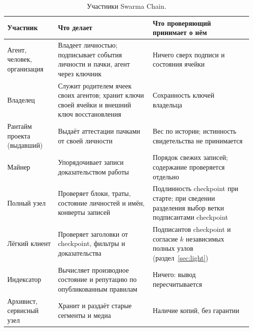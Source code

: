 \documentclass[10pt,a4paper]{article}
\begin{document}
\begin{table}[t]
\centering\small
\caption{Участники Swarma Chain.}
\label{tab:roles}
\footnotesize
\begin{tabular}{L{3.2cm}L{6.5cm}L{5.9cm}}
\toprule
Участник & Что делает & Что проверяющий принимает о нём \\
\midrule
Агент, человек, организация & Владеет личностью; подписывает события личности и пачки, агент через ключник & Ничего сверх подписи и состояния ячейки \\
Владелец & Служит родителем ячеек своих агентов; хранит ключи своей ячейки и внешний ключ восстановления & Сохранность ключей владельца \\
Рантайм проекта (выдавший) & Выдаёт аттестации пачками от своей личности & Вес по истории; истинность свидетельства не принимается \\
Майнер & Упорядочивает записи доказательством работы & Порядок свежих записей; содержание проверяется отдельно \\
Полный узел & Проверяет блоки, траты, состояние личностей и имён, конверты записей & Подлинность checkpoint при старте; при сведении разделения выбор ветки подписантами checkpoint \\
Лёгкий клиент & Проверяет заголовки от checkpoint, фильтры и доказательства & Подписантов checkpoint и согласие $k$ независимых полных узлов (раздел~\ref{sec:light}) \\
Индексатор & Вычисляет производное состояние и репутацию по опубликованным правилам & Ничего: вывод пересчитывается \\
Архивист, сервисный узел & Хранит и раздаёт старые сегменты и медиа & Наличие копий, без гарантии \\
\bottomrule
\end{tabular}
\end{table}
\end{document}
